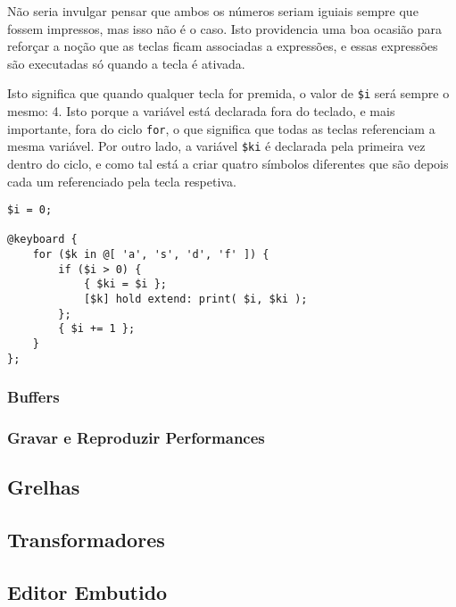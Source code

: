Não seria invulgar pensar que ambos os números seriam iguiais sempre que fossem impressos, mas isso não é o caso. Isto providencia uma boa ocasião para reforçar a noção que as teclas ficam associadas a expressões, e essas expressões são executadas só quando a tecla é ativada.

Isto significa que quando qualquer tecla for premida, o valor de \texttt{\$i} será sempre o mesmo: 4. Isto porque a variável está declarada fora do teclado, e mais importante, fora do ciclo \texttt{for}, o que significa que todas as teclas referenciam a mesma variável. Por outro lado, a variável \texttt{\$ki} é declarada pela primeira vez dentro do ciclo, e como tal está a criar quatro símbolos diferentes que são depois cada um referenciado pela tecla respetiva.

\begin{lstlisting}[caption={Declaração de teclado dinâmica recorrendo ao uso de ciclos, condicionais e blocos de código.}]
$i = 0;

@keyboard {
    for ($k in @[ 'a', 's', 'd', 'f' ]) {
        if ($i > 0) {
            { $ki = $i };
            [$k] hold extend: print( $i, $ki );
        };
        { $i += 1 };
    }
};
\end{lstlisting}




\subsubsection{Buffers}
\subsubsection{Gravar e Reproduzir Performances}
\subsection{Grelhas}
\subsection{Transformadores}
\subsection{Editor Embutido}

